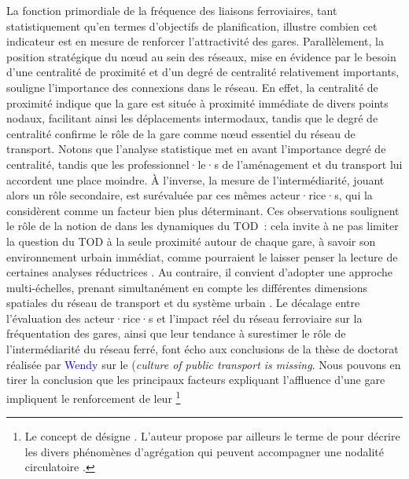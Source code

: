 \begin{refsegment}
La fonction primordiale de la fréquence des liaisons ferroviaires, tant statistiquement qu'en termes d'objectifs de planification, illustre combien cet indicateur est en mesure de renforcer l'attractivité des gares. Parallèlement, la position stratégique du nœud au sein des réseaux, mise en évidence par le besoin d'une centralité de proximité et d'un degré de centralité relativement importants, souligne l'importance des connexions dans le réseau. En effet, la centralité de proximité indique que la gare est située à proximité immédiate de divers points nodaux, facilitant ainsi les déplacements intermodaux, tandis que le degré de centralité confirme le rôle de la gare comme nœud essentiel du réseau de transport. Notons que l'analyse statistique met en avant l'importance degré de centralité, tandis que les professionnel·le·s de l'aménagement et du transport lui accordent une place moindre. À l'inverse, la mesure de l'intermédiarité, jouant alors un rôle secondaire, est surévaluée par ces mêmes acteur·rice·s, qui la considèrent comme un facteur bien plus déterminant. Ces observations soulignent le rôle de la notion de  dans les dynamiques du \acrshort{TOD}~: cela invite à ne pas limiter la question du \acrshort{TOD} à la seule proximité autour de chaque gare, à savoir son environnement urbain immédiat, comme pourraient le laisser penser la lecture de certaines analyses réductrices \textcolor{blue}{\autocite[10]{cerema_articuler_2015}}. Au contraire, il convient d'adopter une approche multi-échelles, prenant simultanément en compte les différentes dimensions spatiales du réseau de transport et du système urbain \textcolor{blue}{\textcite[11]{cervero_transit_1998}}. Le décalage entre l’évaluation des acteur·rice·s et l’impact réel du réseau ferroviaire sur la fréquentation des gares, ainsi que leur tendance à surestimer le rôle de l’intermédiarité du réseau ferré, font écho aux conclusions de la thèse de doctorat réalisée par \textcolor{blue}{Wendy} \textcolor{blue}{\autocite[79]{tan_pursuing_2013}} sur le  (\textsl{culture of public transport is missing}. Nous pouvons en tirer la conclusion que les principaux facteurs expliquant l'affluence d'une gare impliquent le renforcement de leur \footnote{
    Le concept de  désigne  \textcolor{blue}{\autocite[5]{bavoux_nodalite_2005}}. L'auteur propose par ailleurs le terme de  pour décrire les divers phénomènes d'agrégation qui peuvent accompagner une nodalité circulatoire \textcolor{blue}{\autocite[13]{bavoux_nodalite_2005}}.
}
\end{refsegment}
